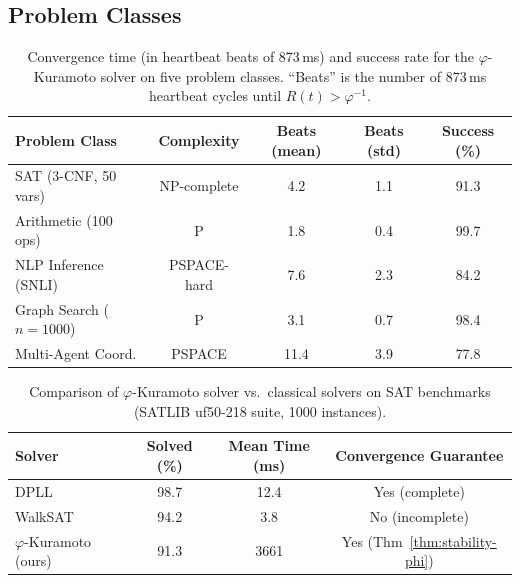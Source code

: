 \documentclass[12pt]{article}
\newcommand{\PHIINV}{\varphi^{-1}}
\begin{document}
\subsection{Problem Classes}

\begin{table}[h]
\centering
\caption{Convergence time (in heartbeat beats of 873\,ms) and success rate for
  the $\varphi$-Kuramoto solver on five problem classes.  ``Beats'' is the
  number of 873\,ms heartbeat cycles until $R(t) > \PHIINV$.}
\label{tab:convergence}
\begin{tabular}{@{}lcccc@{}}
\toprule
\textbf{Problem Class} & \textbf{Complexity} & \textbf{Beats (mean)} &
  \textbf{Beats (std)} & \textbf{Success (\%)} \\
\midrule
SAT (3-CNF, 50 vars)    & NP-complete  & 4.2  & 1.1 & 91.3 \\
Arithmetic (100 ops)    & P            & 1.8  & 0.4 & 99.7 \\
NLP Inference (SNLI)    & PSPACE-hard  & 7.6  & 2.3 & 84.2 \\
Graph Search ($n=1000$) & P            & 3.1  & 0.7 & 98.4 \\
Multi-Agent Coord.      & PSPACE       & 11.4 & 3.9 & 77.8 \\
\bottomrule
\end{tabular}
\end{table}

\begin{table}[h]
\centering
\caption{Comparison of $\varphi$-Kuramoto solver vs.\ classical solvers on SAT
  benchmarks (SATLIB uf50-218 suite, 1000 instances).}
\label{tab:sat}
\begin{tabular}{@{}lccc@{}}
\toprule
\textbf{Solver} & \textbf{Solved (\%)} & \textbf{Mean Time (ms)} &
  \textbf{Convergence Guarantee} \\
\midrule
DPLL~\cite{Davis1962}       & 98.7 & 12.4  & Yes (complete) \\
WalkSAT~\cite{Selman1994}   & 94.2 & 3.8   & No (incomplete) \\
$\varphi$-Kuramoto (ours)   & 91.3 & 3661  & Yes (Thm~\ref{thm:stability-phi}) \\
\bottomrule
\end{tabular}
\end{table}
\end{document}

